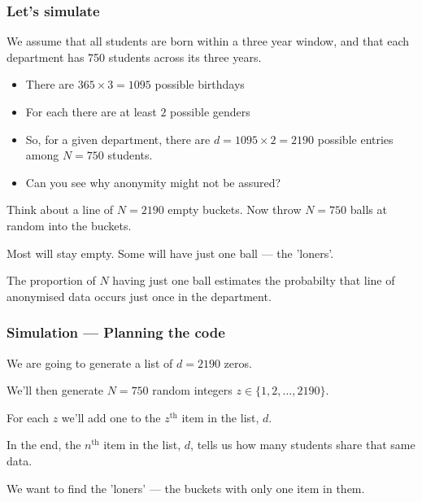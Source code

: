 \documentclass[dvips, %
               xcolor=pst,
               hyperref={colorlinks=false,
               dvips,
               citecolor=magenta,menucolor=cyan,
               bookmarks,bookmarksopen,pdfpagemode=UseThumbs}
              ]{beamer}
\renewcommand{\red}{}
\begin{document}
\begin{frame}[fragile]\frametitle{Let's simulate}

We assume that all students are born within a three year window, and that each
department has 750 students across its three years.

\pause
\begin{itemize}[<+->]

\item There are $365\times 3 = 1095$ possible birthdays

\item For each there are at least $2$ possible genders

\item So, for a given department, there are $d = 1095\times 2 = 2190$
possible entries among $N=750$ students.

\item {\red Can you see why anonymity might not be assured?}

\end{itemize}

\pause\medskip
Think about a line of $N=2190$ empty buckets. Now throw $N=750$ balls at random into
the buckets.

\pause\medskip
Most will stay empty. Some will have just one ball --- the 'loners'.

\pause\medskip
The proportion of $N$ having just one ball estimates the probabilty
that line of anonymised data occurs just once in the department.


\end{frame}

\begin{frame}[fragile]\frametitle{Simulation --- Planning the code}

\pause
We are going to generate a list of $d = 2190$ zeros.

\pause\medskip
We'll then generate $N=750$ random integers $z\in\{1,2,\ldots,2190\}$.

\pause\medskip
For each $z$ we'll add one to the $z^{\mathrm{th}}$ item in the list,
$d$.

\pause\medskip
In the end, the $n^{\mathrm{th}}$ item in the list, $d$, tells us
how many students share that same data.

\pause\medskip
We want to find the 'loners' --- the buckets with only one item in them.

\end{frame}
\end{document}
